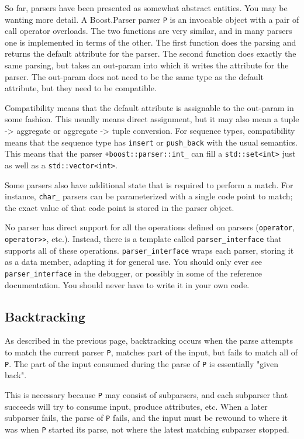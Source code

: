So far, parsers have been presented as somewhat abstract entities. You may be wanting more detail. A Boost.Parser parser \texttt{P} is an invocable object with a pair of call operator overloads. The two functions are very similar, and in many parsers one is implemented in terms of the other. The first function does the parsing and returns the default attribute for the parser. The second function does exactly the same parsing, but takes an out-param into which it writes the attribute for the parser. The out-param does not need to be the same type as the default attribute, but they need to be compatible.

Compatibility means that the default attribute is assignable to the out-param in some fashion. This usually means direct assignment, but it may also mean a tuple -> aggregate or aggregate -> tuple conversion. For sequence types, compatibility means that the sequence type has \texttt{insert} or \texttt{push\_back} with the usual semantics. This means that the parser \texttt{+boost::parser::int\_} can fill a \texttt{std::set<int>} just as well as a \texttt{std::vector<int>}.

Some parsers also have additional state that is required to perform a match. For instance, \texttt{char\_} parsers can be parameterized with a single code point to match; the exact value of that code point is stored in the parser object.

No parser has direct support for all the operations defined on parsers (\texttt{operator\textbar{}}, \texttt{operator>>}, etc.). Instead, there is a template called \texttt{parser\_interface} that supports all of these operations. \texttt{parser\_interface} wraps each parser, storing it as a data member, adapting it for general use. You should only ever see \texttt{parser\_interface} in the debugger, or possibly in some of the reference documentation. You should never have to write it in your own code.

\subsection{Backtracking}

As described in the previous page, backtracking occurs when the parse attempts to match the current parser \texttt{P}, matches part of the input, but fails to match all of \texttt{P}. The part of the input consumed during the parse of \texttt{P} is essentially "given back".

This is necessary because \texttt{P} may consist of subparsers, and each subparser that succeeds will try to consume input, produce attributes, etc. When a later subparser fails, the parse of \texttt{P} fails, and the input must be rewound to where it was when \texttt{P} started its parse, not where the latest matching subparser stopped.


